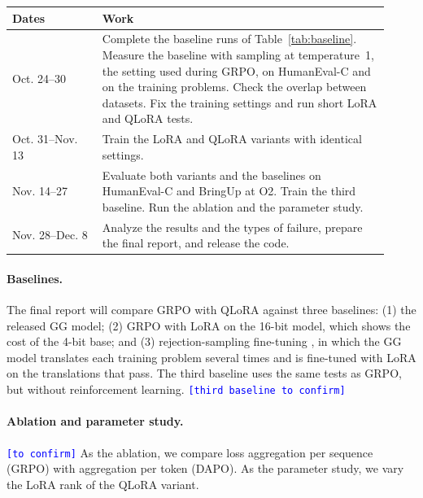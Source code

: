 \documentclass{article}
\newcommand{\placeholder}[1]{\texttt{\textcolor{blue}{[#1]}}}
\begin{document}
\begin{center}
\begin{tabular}{p{0.22\linewidth} p{0.70\linewidth}}
\toprule
\textbf{Dates} & \textbf{Work} \\
\midrule
Oct. 24--30 & Complete the baseline runs of Table~\ref{tab:baseline}. Measure the baseline with sampling at temperature~1, the setting used during GRPO, on HumanEval-C and on the training problems. Check the overlap between datasets. Fix the training settings and run short LoRA and QLoRA tests. \\
Oct. 31--Nov. 13 & Train the LoRA and QLoRA variants with identical settings. \\
Nov. 14--27 & Evaluate both variants and the baselines on HumanEval-C and BringUp at O2. Train the third baseline. Run the ablation and the parameter study. \\
Nov. 28--Dec. 8 & Analyze the results and the types of failure, prepare the final report, and release the code. \\
\bottomrule
\end{tabular}
\end{center}

\paragraph{Baselines.}
The final report will compare GRPO with QLoRA against three baselines: (1) the released GG model; (2) GRPO with LoRA on the 16-bit model, which shows the cost of the 4-bit base; and (3) rejection-sampling fine-tuning \citep{rft}, in which the GG model translates each training problem several times and is fine-tuned with LoRA on the translations that pass. The third baseline uses the same tests as GRPO, but without reinforcement learning. \placeholder{third baseline to confirm}

\paragraph{Ablation and parameter study.}
\placeholder{to confirm} As the ablation, we compare loss aggregation per sequence (GRPO) with aggregation per token (DAPO). As the parameter study, we vary the LoRA rank of the QLoRA variant.
\end{document}
